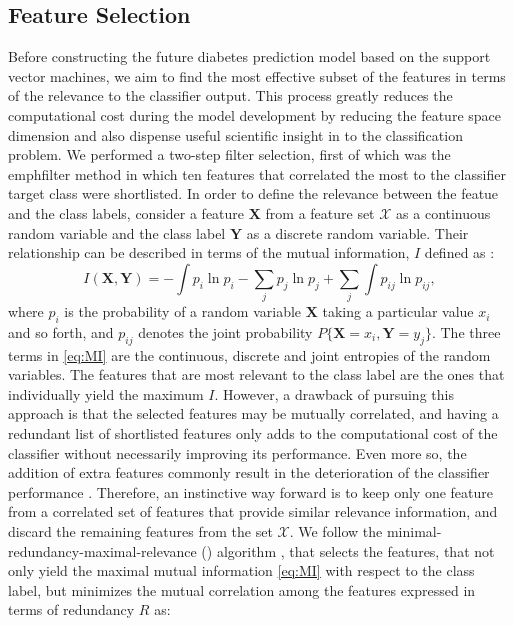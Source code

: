 \documentclass[journal,comsoc]{IEEEtran}
\begin{document}
\subsection{Feature Selection}
%
Before constructing the future diabetes prediction model based on the support vector machines, we aim to find the most effective subset of the features in terms of the relevance to the classifier output. This process greatly reduces the computational cost during the model development by reducing the feature space dimension and also dispense useful scientific insight in to the classification problem. We performed a two-step filter selection, first of which was the emph{filter} method in which ten features that correlated the most to the classifier target class were shortlisted. In order to define the relevance between the featue and the class labels, consider a feature $\mathbf{X}$ from a feature set $\mathcal X$ as a continuous random variable and the class label $\mathbf{Y}$ as a discrete random variable. Their relationship can be described in terms of the mutual information, $I$ defined as \cite{ross2014mutual}:
%
\begin{equation}
  I(\mathbf{X}, \mathbf{Y}) = - \int p_i\ln p_i - \sum_j p_j\ln p_j + \sum_j \int p_{ij}\ln p_{ij},
  \label{eq:MI}
\end{equation}
%
where $p_{i}$ is the probability of a random variable $\mathbf{X}$ taking a particular value $x_i$ and so forth, and $p_{ij}$ denotes the joint probability $P\{\mathbf{X}= x_i, \mathbf{Y}=y_j\}$. The three terms in \eqref{eq:MI} are the continuous, discrete and joint entropies of the random variables. The features that are most relevant to the class label are the ones that individually yield the maximum $I$. However, a drawback of pursuing this approach is that the selected features may be mutually correlated, and having a redundant list of shortlisted features only adds to the computational cost of the classifier without necessarily improving its performance. Even more so, the addition of extra features commonly result in the deterioration of the classifier performance \cite{trunk1979problem}. Therefore, an instinctive way forward is to keep only one feature from a correlated set of features that provide similar relevance information, and discard the remaining features from the set $\mathcal X$. We follow the minimal-redundancy-maximal-relevance () algorithm \cite{mRMR}, that selects the features, that not only yield the maximal mutual information \eqref{eq:MI} with respect to the class label, but minimizes the mutual correlation among the features expressed in terms of redundancy $R$ as:
\end{document}
